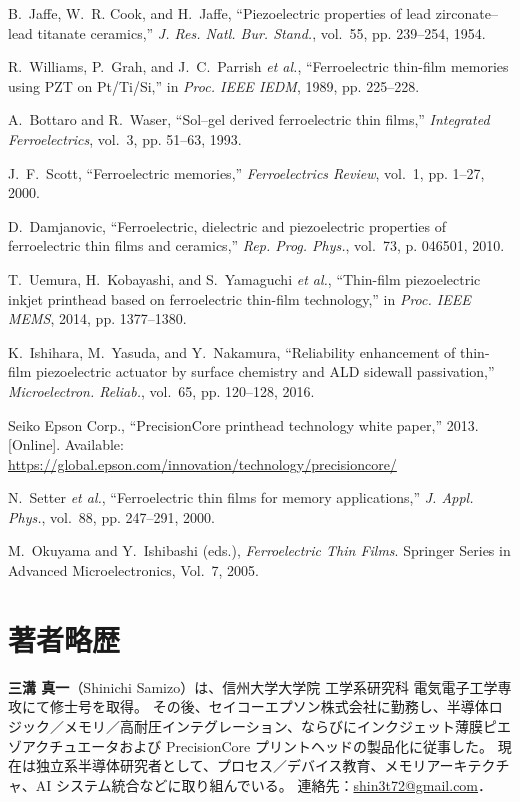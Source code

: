 \documentclass[conference]{IEEEtran}
\begin{document}
\begin{thebibliography}{10}

B.~Jaffe, W.~R. Cook, and H.~Jaffe, ``Piezoelectric properties of lead zirconate--lead titanate ceramics,'' \emph{J. Res. Natl. Bur. Stand.}, vol.~55, pp. 239--254, 1954.

R.~Williams, P.~Grah, and J.~C.~Parrish \emph{et al.}, ``Ferroelectric thin-film memories using PZT on Pt/Ti/Si,'' in \emph{Proc. IEEE IEDM}, 1989, pp. 225--228.

A.~Bottaro and R.~Waser, ``Sol--gel derived ferroelectric thin films,'' \emph{Integrated Ferroelectrics}, vol.~3, pp. 51--63, 1993.

J.~F.~Scott, ``Ferroelectric memories,'' \emph{Ferroelectrics Review}, vol.~1, pp. 1--27, 2000.

D.~Damjanovic, ``Ferroelectric, dielectric and piezoelectric properties of ferroelectric thin films and ceramics,'' \emph{Rep. Prog. Phys.}, vol.~73, p. 046501, 2010.

T.~Uemura, H.~Kobayashi, and S.~Yamaguchi \emph{et al.}, ``Thin-film piezoelectric inkjet printhead based on ferroelectric thin-film technology,'' in \emph{Proc. IEEE MEMS}, 2014, pp. 1377--1380.

K.~Ishihara, M.~Yasuda, and Y.~Nakamura, ``Reliability enhancement of thin-film piezoelectric actuator by surface chemistry and ALD sidewall passivation,'' \emph{Microelectron. Reliab.}, vol.~65, pp. 120--128, 2016.

Seiko Epson Corp., ``PrecisionCore printhead technology white paper,'' 2013. [Online]. Available: \url{https://global.epson.com/innovation/technology/precisioncore/}

N.~Setter \emph{et al.}, ``Ferroelectric thin films for memory applications,'' \emph{J. Appl. Phys.}, vol.~88, pp. 247--291, 2000.

M.~Okuyama and Y.~Ishibashi (eds.), \emph{Ferroelectric Thin Films}. Springer Series in Advanced Microelectronics, Vol.~7, 2005.

\end{thebibliography}

\section*{著者略歴}
\noindent\textbf{三溝 真一}（Shinichi Samizo）は、信州大学大学院 工学系研究科 電気電子工学専攻にて修士号を取得。
その後、セイコーエプソン株式会社に勤務し、半導体ロジック／メモリ／高耐圧インテグレーション、ならびにインクジェット薄膜ピエゾアクチュエータおよび PrecisionCore プリントヘッドの製品化に従事した。
現在は独立系半導体研究者として、プロセス／デバイス教育、メモリアーキテクチャ、AI システム統合などに取り組んでいる。
連絡先：\href{mailto:shin3t72@gmail.com}{shin3t72@gmail.com}．
\end{document}

